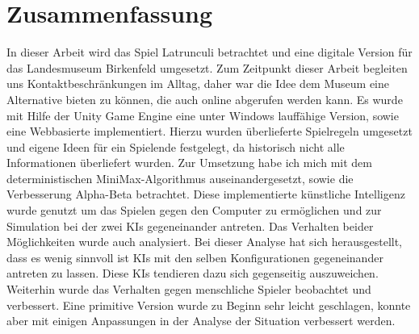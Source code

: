 \chapter*{Zusammenfassung}

In dieser Arbeit wird das Spiel Latrunculi betrachtet und eine digitale Version für das Landesmuseum Birkenfeld umgesetzt. Zum Zeitpunkt dieser Arbeit begleiten uns Kontaktbeschränkungen im Alltag, daher war die Idee dem Museum eine Alternative bieten zu können, die auch online abgerufen werden kann. Es wurde mit Hilfe der Unity Game Engine eine unter Windows lauffähige Version, sowie eine Webbasierte implementiert. Hierzu wurden überlieferte Spielregeln umgesetzt und eigene Ideen für ein Spielende festgelegt, da historisch nicht alle Informationen überliefert wurden. Zur Umsetzung habe ich mich mit dem deterministischen MiniMax-Algorithmus auseinandergesetzt, sowie die Verbesserung Alpha-Beta betrachtet. Diese implementierte künstliche Intelligenz wurde genutzt um das Spielen gegen den Computer zu ermöglichen und zur Simulation bei der zwei KIs gegeneinander antreten. Das Verhalten beider Möglichkeiten wurde auch analysiert. Bei dieser Analyse hat sich herausgestellt, dass es wenig sinnvoll ist KIs mit den selben Konfigurationen gegeneinander antreten zu lassen. Diese KIs tendieren dazu sich gegenseitig auszuweichen. Weiterhin wurde das Verhalten gegen menschliche Spieler beobachtet und verbessert. Eine primitive Version wurde zu Beginn sehr leicht geschlagen, konnte aber mit einigen Anpassungen in der Analyse der Situation verbessert werden.




